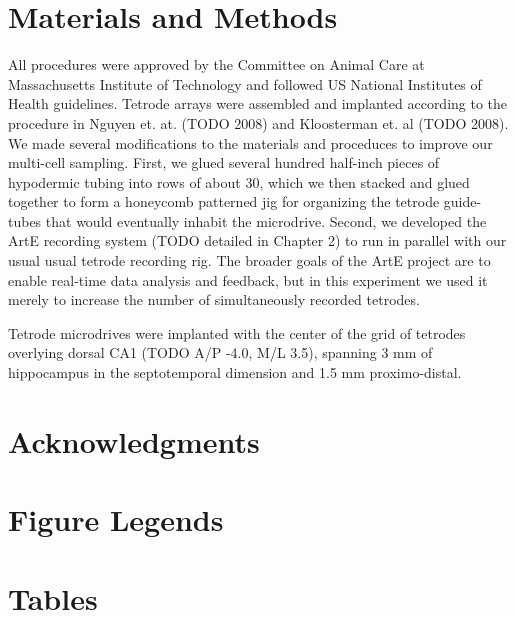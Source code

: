 \documentclass[10pt]{article}
\begin{document}
\section*{Materials and Methods}
All procedures were approved by the Committee on Animal Care at Massachusetts Institute of Technology and followed US National Institutes of Health guidelines. Tetrode arrays were assembled and implanted  according to the procedure in Nguyen et. at. (TODO 2008) and Kloosterman et. al (TODO 2008). We made several modifications to the materials and proceduces to improve our multi-cell sampling.  First, we glued several hundred half-inch pieces of hypodermic tubing into rows of about 30, which we then stacked and glued together to form a honeycomb patterned jig for organizing the tetrode guide-tubes that would eventually inhabit the microdrive. Second, we developed the ArtE recording system (TODO detailed in Chapter 2) to run in parallel with our usual usual tetrode recording rig. The broader goals of the ArtE project are to enable real-time data analysis and feedback, but in this experiment we used it merely to increase the number of simultaneously recorded tetrodes.

Tetrode microdrives were implanted with the center of the grid of tetrodes overlying dorsal CA1 (TODO A/P -4.0, M/L 3.5), spanning 3 mm of hippocampus in the septotemporal dimension and 1.5 mm proximo-distal. 


\section*{Acknowledgments}




\section*{Figure Legends}


\section*{Tables}
\end{document}
